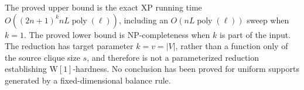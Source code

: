 The proved upper bound is the exact \(\mathrm{XP}\) running time \(O((2n+1)^k nL\operatorname{poly}(\ell))\), including an \(O(nL\operatorname{poly}(\ell))\) sweep when \(k=1\).  The proved lower bound is NP-completeness when \(k\) is part of the input.  The reduction has target parameter \(k=v=|V|\), rather than a function only of the source clique size \(s\), and therefore is not a parameterized reduction establishing \(\mathrm{W}[1]\)-hardness.  No conclusion has been proved for uniform supports generated by a fixed-dimensional balance rule.
